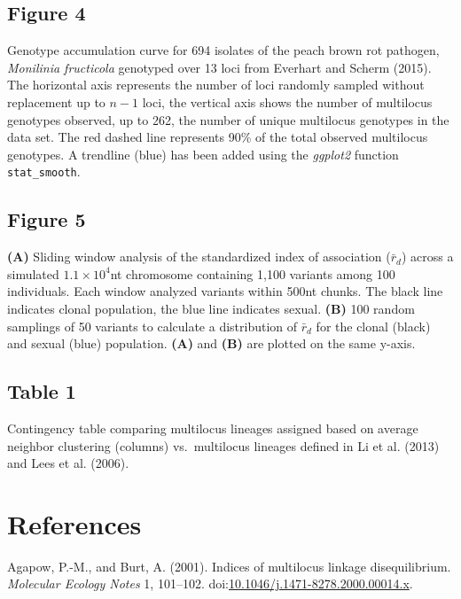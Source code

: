 \documentclass{frontiersSCNS} %
\begin{document}
\subsection*{Figure 4}\label{figure-4-1}

Genotype accumulation curve for 694 isolates of the peach brown rot
pathogen, \emph{Monilinia fructicola} genotyped over 13 loci from
Everhart and Scherm (2015). The horizontal axis represents the number of
loci randomly sampled without replacement up to \(n - 1\) loci, the
vertical axis shows the number of multilocus genotypes observed, up to
262, the number of unique multilocus genotypes in the data set. The red
dashed line represents 90\% of the total observed multilocus genotypes.
A trendline (blue) has been added using the \emph{ggplot2} function
\texttt{stat\_smooth}.

\subsection*{Figure 5}\label{figure-5-1}

\textbf{(A)} Sliding window analysis of the standardized index of
association (\(\bar{r}_d\)) across a simulated \(1.1 \times 10^4\)nt
chromosome containing 1,100 variants among 100 individuals. Each window
analyzed variants within 500nt chunks. The black line indicates clonal
population, the blue line indicates sexual. \textbf{(B)} 100 random
samplings of 50 variants to calculate a distribution of \(\bar{r}_d\)
for the clonal (black) and sexual (blue) population. \textbf{(A)} and
\textbf{(B)} are plotted on the same y-axis.

\subsection*{Table 1}\label{table-1-1}

Contingency table comparing multilocus lineages assigned based on
average neighbor clustering (columns) vs.~multilocus lineages defined in
Li et al. (2013) and Lees et al. (2006).

\section*{References}\label{references}

Agapow, P.-M., and Burt, A. (2001). Indices of multilocus linkage
disequilibrium. \emph{Molecular Ecology Notes} 1, 101--102.
doi:\href{http://dx.doi.org/10.1046/j.1471-8278.2000.00014.x}{10.1046/j.1471-8278.2000.00014.x}.
\end{document}
